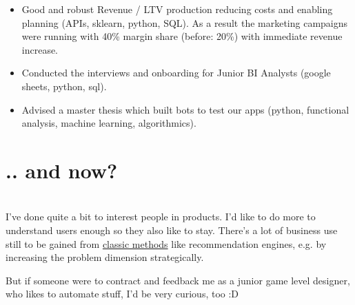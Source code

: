 \documentclass[a4paper]{twentysecondcv} %
\begin{document}
\begin{twenty}
{\begin{itemize}
    APIs) to have individual success/failure factors in just one easy image.
    \item Good and robust Revenue / LTV production reducing costs and enabling planning (APIs, sklearn,
    python, SQL). As a result the marketing campaigns were running with 40\% margin
    share (before: 20\%) with immediate revenue increase.
    \item Conducted the interviews and onboarding for Junior BI Analysts (google sheets, python, sql).
    \item Advised a master thesis which built bots to test our apps (python, functional 
    analysis, machine learning, algorithmics).
    \end{itemize}}
\end{twenty}

\section{.. and now?}\\
I've done quite a bit to interest people in products. I'd like to do more to understand
users enough so they also like to stay. There's a lot of business use still to be gained
from \href{https://en.wikipedia.org/wiki/Netflix_Prize}{classic methods} like recommendation engines,
e.g. by increasing the problem dimension strategically.

But if someone were to contract and feedback me as a junior game level designer, who likes to 
automate stuff, I'd be very curious, too :D
\end{document}
